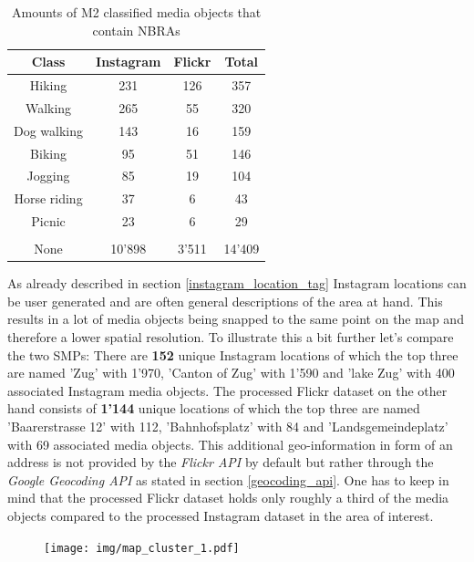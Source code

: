 \begin{table}[h!]
\begin{center}
\caption{Amounts of M2 classified media objects that contain NBRAs}\vspace{1ex}
\label{tab:amount_class_NBRAs}
\begin{tabular}{cccc}\hline
Class & Instagram & Flickr & Total\\ \hline
Hiking & 231 & 126 & 357\\
Walking & 265 & 55 & 320\\
Dog walking & 143 & 16 & 159\\
Biking & 95 & 51 & 146\\
Jogging & 85 & 19 & 104\\
Horse riding & 37 & 6 & 43\\
Picnic & 23 & 6 & 29\\
 & & & \\
None & 10'898 & 3'511 & 14'409\\
\hline
\end{tabular}
\end{center}
\end{table}

As already described in section \ref{instagram_location_tag} Instagram locations can be user generated and are often general descriptions of the area at hand. This results in a lot of media objects being snapped to the same point on the map and therefore a lower spatial resolution. To illustrate this a bit further let's compare the two SMPs:
There are \textbf{152} unique Instagram locations of which the top three are named 'Zug' with 1'970, 'Canton of Zug' with 1'590 and 'lake Zug' with 400 associated Instagram media objects.
The processed Flickr dataset on the other hand consists of \textbf{1'144} unique locations of which the top three are named 'Baarerstrasse 12' with 112, 'Bahnhofsplatz' with 84 and 'Landsgemeindeplatz' with 69 associated media objects. This additional geo-information in form of an address is not provided by the \textit{Flickr API} by default but rather through the \textit{Google Geocoding API} as stated in section \ref{geocoding_api}.
One has to keep in mind that the processed Flickr dataset holds only roughly a third of the media objects compared to the processed Instagram dataset in the area of interest. 

\begin{figure}[h!]
   \centering
   \texttt{[image: img/map\_cluster\_1.pdf]}
\end{figure}

